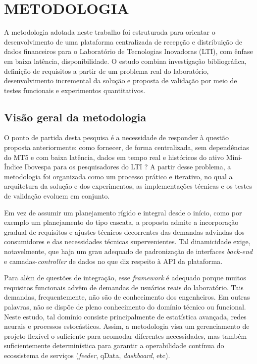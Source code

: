 \chapter{METODOLOGIA}

A metodologia adotada neste trabalho foi estruturada para orientar o desenvolvimento de uma plataforma centralizada de recepção e distribuição de dados financeiros para o Laboratório de Tecnologias Inovadoras (LTI), com ênfase em baixa latência, disponibilidade. O estudo combina investigação bibliográfica, definição de requisitos a partir de um problema real do laboratório, desenvolvimento incremental da solução e proposta de validação por meio de testes funcionais e experimentos quantitativos.

\section{Visão geral da metodologia}

O ponto de partida desta pesquisa é a necessidade de responder à questão proposta anteriormente: como fornecer, de forma centralizada, sem dependências do MT5 e com baixa latência, dados em tempo real e históricos do ativo Mini-Índice Ibovespa para os pesquisadores do LTI ? A partir desse problema, a metodologia foi organizada como um processo prático e iterativo, no qual a arquitetura da solução e dos experimentos, as implementações técnicas e os testes de validação evoluem em conjunto.

Em vez de assumir um planejamento rígido e integral desde o início, como por exemplo um planejamento do tipo cascata, a proposta admite a incorporação gradual de requisitos e ajustes técnicos decorrentes das demandas advindas dos consumidores e das necessidades técnicas supervenientes. Tal dinamicidade exige, notavelmente, que haja um grau adequado de padronização de interfaces \textit{back-end} e camadas-\textit{controller} de dados no que diz respeito à API da plataforma.

Para além de questões de integração, esse \textit{framework} é adequado porque muitos requisitos funcionais advêm de demandas de usuários reais do laboratório. Tais demandas, frequentemente, não são de conhecimento dos engenheiros. Em outras palavras, não se dispõe de pleno conhecimento do domínio técnico ou funcional. Neste estudo, tal domínio consiste principalmente de estatística avançada, redes neurais e processos estocásticos. Assim, a metodologia visa um gerenciamento de projeto flexível o suficiente para acomodar diferentes necessidades, mas também suficientemente determinística para garantir a operabilidade contínua do ecossistema de serviços (\textit{feeder}, qData, \textit{dashboard}, etc).


